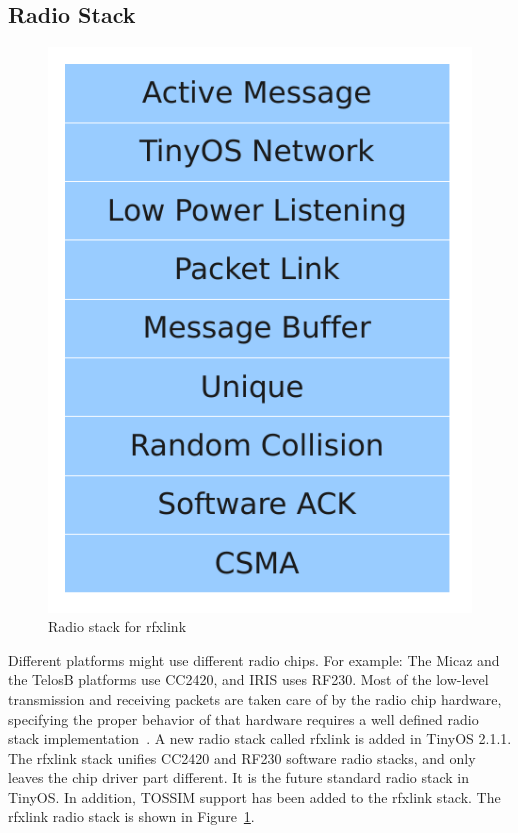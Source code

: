 \subsection{Radio Stack}
\label{Sim:radio stack}
\begin{figure}[htbp]
  \begin{center}
    \leavevmode
      \includegraphics[scale=0.5]{Pics/Rfxlinklayer.pdf}
   \caption{Radio stack for rfxlink}
    \label{fig:rfxlinklayer}
  \end{center}
\end{figure}
Different platforms might use different radio chips. For example: The Micaz and the TelosB platforms use CC2420, and IRIS uses RF230. Most of the low-level transmission and receiving packets are taken care of by the radio chip hardware, specifying the proper behavior of that hardware requires a well defined radio stack implementation~\cite{TEP 126}.
A new radio stack called rfxlink is added in TinyOS 2.1.1. The rfxlink stack unifies CC2420 and RF230 software radio stacks, and only leaves the chip driver part different. It is the future standard radio stack in TinyOS. In addition, TOSSIM support has been added to the rfxlink stack.
The rfxlink radio stack is shown in Figure~\ref{fig:rfxlinklayer}.

